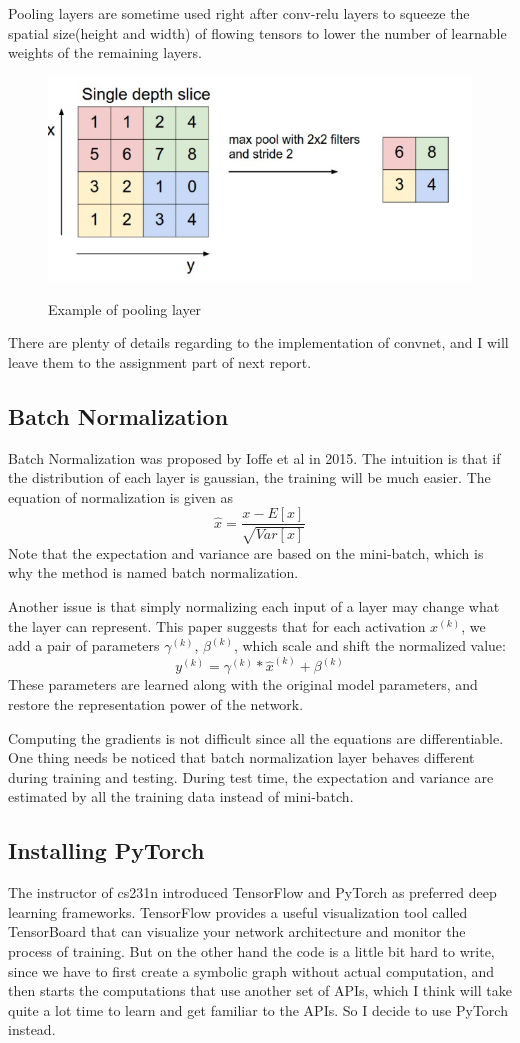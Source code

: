 \documentclass{article} %
\begin{document}
Pooling layers are sometime used right after conv-relu layers to squeeze the spatial size(height and width) of flowing tensors to lower the number of learnable weights of the remaining layers. 
\begin{figure}[H]
    \centering
    \includegraphics[width=.5\textwidth]{poolinglayer.png}
    \label{fig:poolinglayer}
    \caption{Example of pooling layer}
\end{figure}

There are plenty of details regarding to the implementation of convnet, and I will leave them to the assignment part of next report.

\subsection{Batch Normalization}
Batch Normalization was proposed by Ioffe et al in 2015. The intuition is that if the distribution of each layer is gaussian, the training will be much easier. The equation of normalization is given as $$\hat{x}=\frac{x-E[x]}{\sqrt{Var[x]}}$$
Note that the expectation and variance are based on the mini-batch, which is why the method is named batch normalization.

Another issue is that simply normalizing each input of a layer may change what the layer can represent. This paper suggests that for each activation $x^{(k)}$, we add a pair of parameters $\gamma^{(k)}$, $\beta^{(k)}$, which scale and shift the normalized value:
$$y^{(k)}=\gamma^{(k)} * \hat{x}^{(k)} + \beta^{(k)}$$
These parameters are learned along with the original model parameters, and restore the representation power of the network.

Computing the gradients is not difficult since all the equations are differentiable. One thing needs be noticed that batch normalization layer behaves different during training and testing. During test time, the expectation and variance are estimated by all the training data instead of mini-batch.

\subsection{Installing PyTorch}
The instructor of cs231n introduced TensorFlow and PyTorch as preferred deep learning frameworks. TensorFlow provides a useful visualization tool called TensorBoard that can visualize your network architecture and monitor the process of training. But on the other hand the code is a little bit hard to write, since we have to first create a symbolic graph without actual computation, and then starts the computations that use another set of APIs, which I think will take quite a lot time to learn and get familiar to the APIs.  So I decide to use PyTorch instead.
\end{document}
